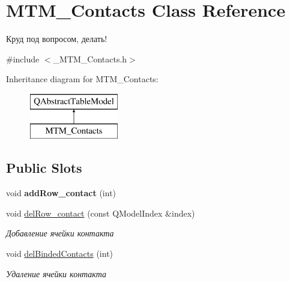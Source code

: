 \hypertarget{class_m_t_m___contacts}{}\section{M\+T\+M\+\_\+\+Contacts Class Reference}
\label{class_m_t_m___contacts}


Круд под вопросом, делать!  




{\ttfamily \#include $<$\+\_\+\+M\+T\+M\+\_\+\+Contacts.\+h$>$}

Inheritance diagram for M\+T\+M\+\_\+\+Contacts\+:\begin{figure}[H]
\begin{center}
\leavevmode
\includegraphics[height=2.000000cm]{class_m_t_m___contacts}
\end{center}
\end{figure}
\subsection*{Public Slots}
\begin{DoxyCompactItemize}
\item 
\mbox{\label{class_m_t_m___contacts_a764704aa3f3f9ac2bd0b33693bb081a1}} 
void {\bfseries add\+Row\+\_\+contact} (int)
\item 
\mbox{\label{class_m_t_m___contacts_a7639c017d5981bb4fd5340f3acd4b2e8}} 
void \mbox{\hyperlink{class_m_t_m___contacts_a7639c017d5981bb4fd5340f3acd4b2e8}{del\+Row\+\_\+contact}} (const Q\+Model\+Index \&index)
\begin{DoxyCompactList}\small\item\em Добавление ячейки контакта \end{DoxyCompactList}\item 
\mbox{\label{class_m_t_m___contacts_ad15e304e3286efe8602424c06a76f143}} 
void \mbox{\hyperlink{class_m_t_m___contacts_ad15e304e3286efe8602424c06a76f143}{del\+Binded\+Contacts}} (int)
\begin{DoxyCompactList}\small\item\em Удаление ячейки контакта \end{DoxyCompactList}\end{DoxyCompactItemize}
